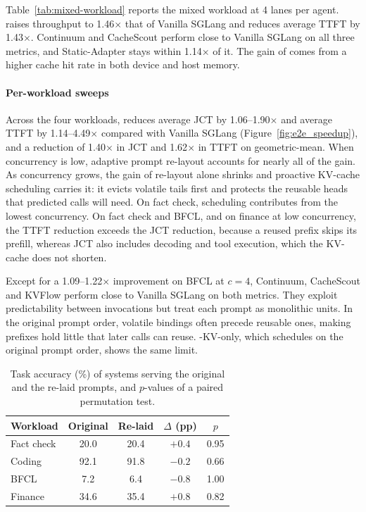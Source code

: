 Table~\ref{tab:mixed-workload} reports the mixed workload at 4 lanes per agent. \sysname raises throughput to 1.46$\times$ that of Vanilla SGLang and reduces average TTFT by 1.43$\times$. Continuum and CacheScout perform close to Vanilla SGLang on all three metrics, and Static-Adapter stays within 1.14$\times$ of it. The gain of \sysname comes from a higher cache hit rate in both device and host memory.




\paragraph{Per-workload sweeps}
Across the four workloads, \sysname reduces average JCT by 1.06--1.90$\times$ and average TTFT by 1.14--4.49$\times$ compared with Vanilla SGLang (Figure~\ref{fig:e2e_speedup}), and a reduction of 1.40$\times$ in JCT and 1.62$\times$ in TTFT on geometric-mean. When concurrency is low, adaptive prompt re-layout accounts for nearly all of the gain. As concurrency grows, the gain of re-layout alone shrinks and proactive KV-cache scheduling carries it: it evicts volatile tails first and protects the reusable heads that predicted calls will need. On fact check, scheduling contributes from the lowest concurrency. On fact check and BFCL, and on finance at low concurrency, the TTFT reduction exceeds the JCT reduction, because a reused prefix skips its prefill, whereas JCT also includes decoding and tool execution, which the KV-cache does not shorten.

Except for a 1.09--1.22$\times$ improvement on BFCL at $c=4$, Continuum, CacheScout and KVFlow perform close to Vanilla SGLang on both metrics. They exploit predictability between invocations but treat each prompt as monolithic units. In the original prompt order, volatile bindings often precede reusable ones, making prefixes hold little that later calls can reuse. \sysname-KV-only, which schedules on the original prompt order, shows the same limit.


\begin{table}[tb]
\centering
\fontsize{8}{10}\selectfont
\setlength{\tabcolsep}{3.5pt}
\renewcommand{\arraystretch}{1.15}
\caption{Task accuracy (\%) of systems serving the original and the re-laid prompts, and $p$-values of a paired permutation test.}
\label{tab:quality}
\begin{tabular}{@{}lcccc@{}}
\toprule
Workload & Original & Re-laid & $\Delta$ (pp) & $p$ \\
\midrule
Fact check & 20.0 & 20.4 & $+0.4$ & 0.95 \\
Coding     & 92.1 & 91.8 & $-0.2$ & 0.66 \\
BFCL       &  7.2 &  6.4 & $-0.8$ & 1.00 \\
Finance    & 34.6 & 35.4 & $+0.8$ & 0.82 \\
\bottomrule
\end{tabular}
\end{table}


